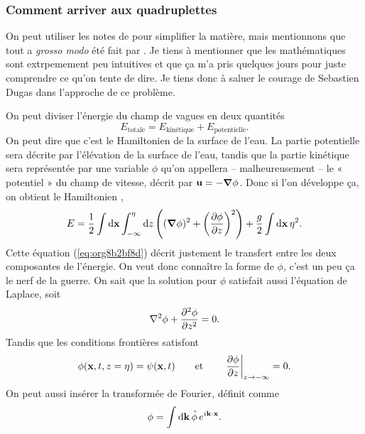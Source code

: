 \documentclass[10pt]{article}
\numberwithin{equation}{section}
\newcommand{\xx}{\vb{x}}
\begin{document}
\subsubsection{Comment arriver aux quadruplettes}
\label{sec:orga04f757}

On peut utiliser les notes de \Textcite[Chap.4 \emph{Nonlinear wave–wave interactions and wave dissipation}]{Janssen2004chap4} pour simplifier la matière, mais mentionnons que tout a \emph{grosso modo} été fait par \Textcite{Hasselmann_1962}.
Je tiens à mentionner que les mathématiques sont extrpemement peu intuitives et que ça m'a pris quelques jours pour juste comprendre ce qu'on tente de dire. Je tiens donc à saluer le courage de Sebastien Dugas dans l'approche de ce problème. \bigskip

On peut diviser l'énergie du champ de vagues en deux quantités \autocite{Hasselmann_1962}
\begin{equation}
   E_\text{totale} = E_\text{kinétique} + E_\text{potentielle}.
\end{equation}
On peut dire que c'est le Hamiltonien de la surface de l'eau.
La partie potentielle sera décrite par l'élévation de la surface de l'eau, tandis que la partie kinétique sera représentée par une variable \(\phi\) qu'on appellera -- malheureusement -- le « potentiel » du champ de vitesse, décrit par \(\vb{u} = -\gradient{\phi}\).
Donc si l'on développe ça, on obtient le Hamiltonien \autocite{Janssen2004chap4},
\begin{equation}
\label{eq:org8b2bf8d}
   E = \frac{1}{2} \int\dd \xx \int_{-\infty}^\eta\dd z\, \qty( (\gradient{\phi})^2 + \qty(\pdv{\phi}{z})^2 ) + \frac{g}{2} \int \dd\xx\, \eta^2.
\end{equation}
Cette équation  (\ref{eq:org8b2bf8d}) décrit justement le transfert entre les deux composantes de l'énergie.
On veut donc connaître la forme de \(\phi\), c'est un peu ça le nerf de la guerre.
On sait que la solution pour \(\phi\) satisfait aussi l'équation de Laplace, soit
\begin{equation}
   \laplacian{\phi} + \pdv[2]{\phi}{z} = 0.
\end{equation}
Tandis que les conditions frontières satisfont 
\begin{equation}
    \phi(\xx, t, z = \eta) = \psi(\xx,t)  \qquad \text{et} \qquad \eval{\pdv{\phi}{z}}_{z\rightarrow-\infty} = 0.
\end{equation}
On peut aussi insérer la transformée de Fourier, définit comme
\begin{equation}
   \phi = \int\dd\vb{k}\, \hat{\phi}\, e^{i\vb{k}\cdot\xx}.
\end{equation}
\end{document}

